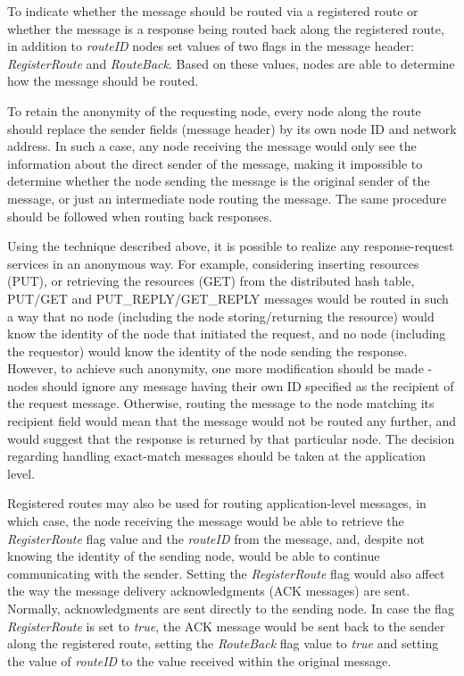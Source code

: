 To indicate whether the message should be routed via a registered route or whether the message is a response being routed back along the registered route, in addition to \emph{routeID} nodes set values of two flags in the message header: \emph{RegisterRoute} and \emph{RouteBack}. Based on these values, nodes are able to determine how the message should be routed.

To retain the anonymity of the requesting node, every node along the route should replace the sender fields (message header) by its own node ID and network address. In such a case, any node receiving the message would only see the information about the direct sender of the message, making it impossible to determine whether the node sending the message is the original sender of the message, or just an intermediate node routing the message. The same procedure should be followed when routing back responses.

Using the technique described above, it is possible to realize any response-request services in an anonymous way. For example, considering inserting resources (PUT), or retrieving the resources (GET) from the distributed hash table, PUT/GET and PUT\_REPLY/GET\_REPLY messages would be routed in such a way that no node (including the node storing/returning the resource) would know the identity of the node that initiated the request, and no node (including the requestor) would know the identity of the node sending the response. However, to achieve such anonymity, one more modification should be made - nodes should ignore any message having their own ID specified as the recipient of the request message. Otherwise, routing the message to the node matching its recipient field would mean that the message would not be routed any further, and would suggest that the response is returned by that particular node. The decision regarding handling exact-match messages should be taken at the application level.

Registered routes may also be used for routing application-level messages, in which case, the node receiving the message would be able to retrieve the \emph{RegisterRoute} flag value and the \emph{routeID} from the message, and, despite not knowing the identity of the sending node, would be able to continue communicating with the sender. Setting the \emph{RegisterRoute} flag would also affect the way the message delivery acknowledgments (ACK messages) are sent. Normally, acknowledgments are sent directly to the sending node. In case the flag \emph{RegisterRoute} is set to \emph{true}, the ACK message would be sent back to the sender along the registered route, setting the \emph{RouteBack} flag value to \emph{true} and setting the value of \emph{routeID} to the value received within the original message.

